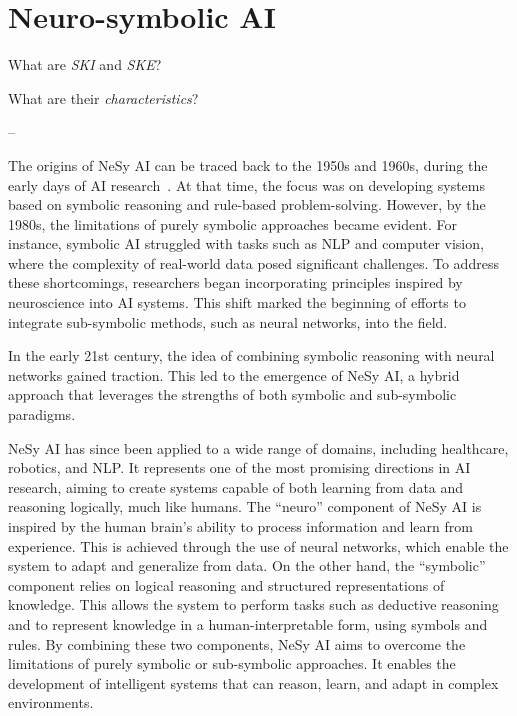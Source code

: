 
\chapter{Neuro-symbolic AI}
\label{ch:nesy-ai}

\begin{flushright}
\begin{minipage}{0.5\textwidth}
    What are \emph{\gls{SKI}} and \emph{\gls{SKE}}?

    What are their \emph{characteristics}?

    -- \textbf{}
\end{minipage}
\end{flushright}

\minitoc

The origins of \gls{NeSy} \gls{AI} can be traced back to the 1950s and 1960s, during the early days of \gls{AI} research~\cite{Youheng_2023}.
%
At that time, the focus was on developing systems based on symbolic reasoning and rule-based problem-solving.
%
However, by the 1980s, the limitations of purely symbolic approaches became evident.
%
For instance, symbolic \gls{AI} struggled with tasks such as \gls{NLP} and computer vision, where the complexity of real-world data posed significant challenges.
%
To address these shortcomings, researchers began incorporating principles inspired by neuroscience into \gls{AI} systems.
%
This shift marked the beginning of efforts to integrate sub-symbolic methods, such as neural networks, into the field.

In the early 21st century, the idea of combining symbolic reasoning with neural networks gained traction.
%
This led to the emergence of \gls{NeSy} \gls{AI}, a hybrid approach that leverages the strengths of both symbolic and sub-symbolic paradigms.


\Gls{NeSy} \gls{AI} has since been applied to a wide range of domains, including healthcare, robotics, and \gls{NLP}.
%
It represents one of the most promising directions in \gls{AI} research, aiming to create systems capable of both learning from data and reasoning logically, much like humans.
%
The ``neuro'' component of \gls{NeSy} \gls{AI} is inspired by the human brain's ability to process information and learn from experience.
%
This is achieved through the use of neural networks, which enable the system to adapt and generalize from data.
%
On the other hand, the ``symbolic'' component relies on logical reasoning and structured representations of knowledge.
%
This allows the system to perform tasks such as deductive reasoning and to represent knowledge in a human-interpretable form, using symbols and rules.
%
By combining these two components, \gls{NeSy} \gls{AI} aims to overcome the limitations of purely symbolic or sub-symbolic approaches.
%
It enables the development of intelligent systems that can reason, learn, and adapt in complex environments.


